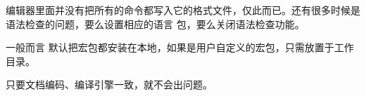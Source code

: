 编辑器里面并没有把所有的命令都写入它的格式文件，仅此而已。还有很多时候是语法检查的问题，要么设置相应的语言
包，要么关闭语法检查功能。



一般而言 \TeXLive{} 默认把宏包都安装在本地，如果是用户自定义的宏包，只需放置于工作目录。







只要文档编码、编译引擎一致，就不会出问题。





